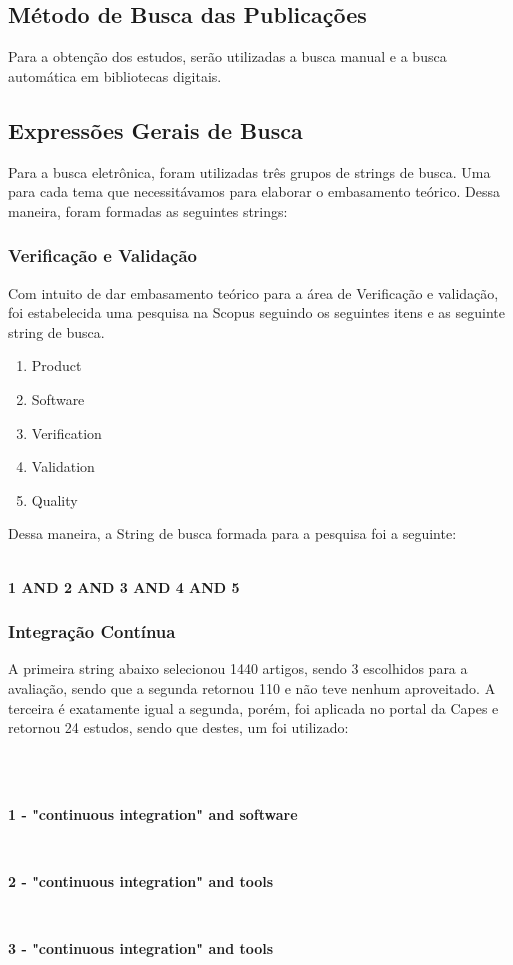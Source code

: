 \subsection{Método de Busca das Publicações}
\label{sub:Método de Busca das Publicações}
Para a obtenção dos estudos, serão utilizadas a busca manual e a busca
automática em bibliotecas digitais.

\subsection{Expressões Gerais de Busca}
\label{sub:Expressões Gerais de Busca}
Para a busca eletrônica, foram utilizadas três grupos de strings de busca.
Uma para cada tema que necessitávamos para elaborar o embasamento teórico.
Dessa maneira, foram formadas as seguintes strings:

\subsubsection{Verificação e Validação}
\label{sub:Verificação e Validação}
Com intuito de dar embasamento teórico para a área de Verificação e validação,
foi estabelecida uma pesquisa na Scopus seguindo os seguintes itens e as
seguinte string de busca.
\begin{enumerate}
    \item Product
    \item Software
    \item Verification
    \item Validation
    \item Quality
\end{enumerate}
Dessa maneira, a String de busca formada para a pesquisa foi a seguinte:
\\
\\
\centerline{\textbf{1 AND 2 AND 3 AND 4 AND 5}}

\subsubsection{Integração Contínua}
\label{sub:Integração Contínua}
A primeira string abaixo selecionou 1440 artigos, sendo 3 escolhidos para a
avaliação, sendo que a segunda retornou 110 e não teve nenhum aproveitado. A
terceira é exatamente igual a segunda, porém, foi aplicada no portal da Capes e
retornou 24 estudos, sendo que destes, um foi utilizado:

\\
\\
\centerline{\textbf{1 - "continuous integration" and software}}
\\
\centerline{\textbf{2 - "continuous integration" and tools}}
\\
\centerline{\textbf{3 - "continuous integration" and tools}}



